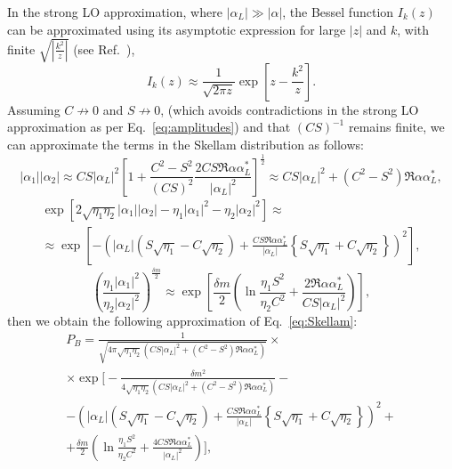 In the strong LO approximation, where $|\alpha_L|\gg|\alpha|$, the Bessel function $I_k(z)$ can be approximated using its asymptotic expression for large $|z|$ and $k$, with finite $\sqrt{\left|\frac{k^2}{z}\right|}$ (see Ref.~\cite{doi:10.1080/09500349808231235,freyberger1993photon}),
\begin{equation}
    I_k(z)\approx\frac{1}{\sqrt{2\pi z}}\exp\left[z-\frac{k^2}{z}\right]. \label{eq:hole}
\end{equation}
Assuming $C\not\to0$ and $S\not\to0$, (which avoids contradictions in the strong LO approximation as per Eq.~\eqref{eq:amplitudes}) and that $(CS)^{-1}$ remains finite, we can approximate the terms in the Skellam distribution as follows:
\begin{equation}
    |\alpha_1||\alpha_2|
    \approx
    CS|\alpha_L|^2\left[1+\frac{C^2-S^2}{(CS)^2}\frac{2CS\Re\alpha\alpha_L^*}{|\alpha_L|^2}\right]^{\frac{1}{2}}
    \approx
    CS|\alpha_L|^2+\left(C^2-S^2\right){\Re\alpha\alpha_L^*},
\end{equation}
\begin{multline}
    \exp\left[
    2\sqrt{\eta_1\eta_2}|\alpha_1||\alpha_2|-\eta_1|\alpha_1|^2-\eta_2|\alpha_2|^2
    \right]\approx
\\
    \approx\exp\left[-\left(|\alpha_L|(S\sqrt{\eta_1}-C\sqrt{\eta_2})+\frac{CS\Re\alpha\alpha_L^*}{|\alpha_L|}\left\{S\sqrt{\eta_1}+C\sqrt{\eta_2}\right\}\right)^2\right],
\end{multline}
\begin{equation}
        \left(\frac{{\eta_1}|\alpha_1|^2}{{\eta_2}|\alpha_2|^2}\right)^{\frac{\delta m}{2}}\approx
    \exp\left[\frac{\delta m}{2}\left(
    \ln\frac{\eta_1S^2}{\eta_2C^2}+\frac{2\Re\alpha\alpha_L^*}{CS|\alpha_L|^2}\right)
    \right],
    \label{eq:hole2}
\end{equation}
then we obtain the following approximation of Eq.~\eqref{eq:Skellam}:
\begin{multline}
        P_B=
    \frac{1}{\sqrt{4\pi\sqrt{\eta_1\eta_2}\left(CS|\alpha_L|^2+(C^2-S^2){\Re\alpha\alpha_L^*}\right)}}
    \times\\\times\exp\biggl[
    -\frac{\delta m^2}{4\sqrt{\eta_1\eta_2}\left(CS|\alpha_L|^2+\left(C^2-S^2\right){\Re\alpha\alpha_L^*}\right)}-\\-\left(
|\alpha_L|(S\sqrt{\eta_1}-C\sqrt{\eta_2})+\frac{CS\Re\alpha\alpha_L^*}{|\alpha_L|}\left\{
S\sqrt{\eta_1}+C\sqrt{\eta_2}
\right\}
\right)^2
    +\\+
    \frac{\delta m}{2}\left(
    \ln\frac{\eta_1S^2}{\eta_2C^2}+\frac{4CS\Re\alpha\alpha_L^*}{|\alpha_L|^2}\right)
    \biggr],
\end{multline}
